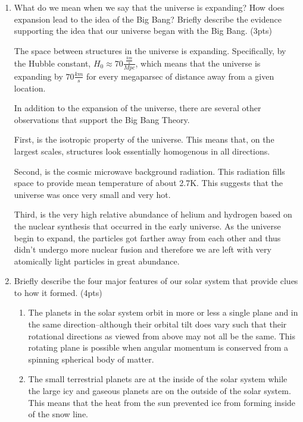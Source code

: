 \documentclass{article}
\begin{document}
\begin{enumerate}[start=15]
    \item What do we mean when we say that the universe is expanding? How does expansion lead to the idea of the Big Bang? Briefly describe the evidence supporting the idea that our universe began with the Big Bang. (3pts)
    
    The space between structures in the universe is expanding. Specifically, by the Hubble constant, $H_0 \approx 70 \si{\frac{\frac{km}{s}}{Mpc}}$, which means that the universe is expanding by $70 \si{\frac{km}{s}}$ for every megaparsec of distance away from a given location.

    In addition to the expansion of the universe, there are several other observations that support the Big Bang Theory. 

    First, is the isotropic property of the universe. This means that, on the largest scales, structures look essentially homogenous in all directions.

    Second, is the cosmic microwave background radiation. This radiation fills space to provide mean temperature of about 2.7K. This suggests that the universe was once very small and very hot.

    Third, is the very high relative abundance of helium and hydrogen based on the nuclear synthesis that occurred in the early universe. As the universe begin to expand, the particles got farther away from each other and thus didn't undergo more nuclear fusion and therefore we are left with very atomically light particles in great abundance.

    \item Briefly describe the four major features of our solar system that provide clues to how it formed. (4pts)
    
    \begin{enumerate}
        \item The planets in the solar system orbit in more or less a single plane and in the same direction--although their orbital tilt does vary such that their rotational directions as viewed from above may not all be the same. This rotating plane is possible when angular momentum is conserved from a spinning spherical body of matter.
        
        \item The small terrestrial planets are at the inside of the solar system while the large icy and gaseous planets are on the outside of the solar system. This means that the heat from the sun prevented ice from forming inside of the snow line.
        

\end{enumerate}
\end{enumerate}
\end{document}
